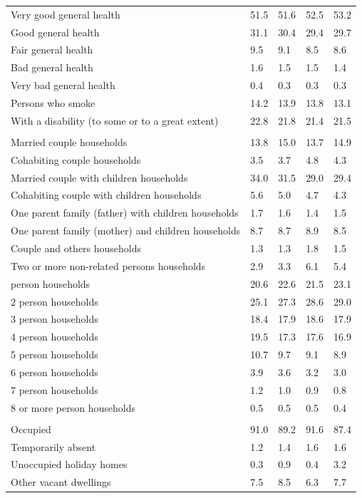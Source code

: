 \documentclass{article}
\begin{document}
\begin{table}[h]
\begin{tabular}{KTTTT}
    \hline
Very good general health & 51.5& 51.6&52.5& 53.2\\
Good general health & 31.1& 30.4& 29.4& 29.7\\
Fair general health & 9.5& 9.1&8.5& 8.6\\
Bad general health & 1.6& 1.5&1.5& 1.4\\
Very bad general health & 0.4& 0.3&0.3& 0.3\\
    \hline
Persons who smoke & 14.2& 13.9&13.8& 13.1\\
    \hline
With a disability (to some or to a great extent) & 22.8& 21.8&21.4& 21.5\\
\hline
    \\ 
    \hline
Married couple households & 13.8& 15.0& 13.7& 14.9\\
Cohabiting couple households & 3.5& 3.7& 4.8& 4.3\\
Married couple with children households & 34.0& 31.5& 29.0& 29.4\\
Cohabiting couple with children households & 5.6& 5.0& 4.7& 4.3\\
One parent family (father) with  children households & 1.7& 1.6& 1.4& 1.5\\
One parent family (mother) and children households & 8.7& 8.7& 8.9& 8.5\\
Couple and others households  & 1.3& 1.3& 1.8& 1.5\\
Two or more non-related persons households & 2.9& 3.3& 6.1& 5.4\\
     person households & 20.6& 22.6& 21.5& 23.1\\
2 person households & 25.1& 27.3& 28.6& 29.0\\
3 person households & 18.4& 17.9& 18.6& 17.9\\
4 person households & 19.5& 17.3& 17.6& 16.9\\
5 person households & 10.7&  9.7&  9.1&  8.9\\
6 person households & 3.9& 3.6& 3.2& 3.0\\
7 person households & 1.2& 1.0& 0.9& 0.8\\
8 or more person households & 0.5& 0.5& 0.5& 0.4\\
\hline
    \\ 
    \hline
Occupied & 91.0& 89.2& 91.6& 87.4\\
Temporarily absent & 1.2& 1.4& 1.6& 1.6\\
Unoccupied holiday homes & 0.3& 0.9& 0.4& 3.2\\
Other vacant dwellings & 7.5& 8.5& 6.3& 7.7\\
\hline
\end{tabular}
\end{table}
\end{document}

